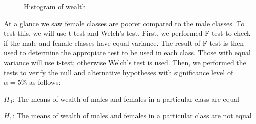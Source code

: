 \begin{figure}[!h]
\centering 
{}


\caption{Histogram of wealth} \label{fig:Histogram of Wealth}

\end{figure}

At a glance we saw female classes are poorer compared to the male classes. To test this, we will use t-test and Welch's test. First, we performed F-test to check if the male and female classes have equal variance. The result of F-test is then used to determine the appropiate test to be used in each class. Those with equal variance will use t-test; otherwise Welch's test is used. Then, we performed the tests to verify the null and alternative hypotheses with significance level of \(\alpha=5\%\) as follows:

\(H_0\): The means of wealth of males and females in a particular class are equal

\(H_1\): The means of wealth of males and females in a particular class are not equal

